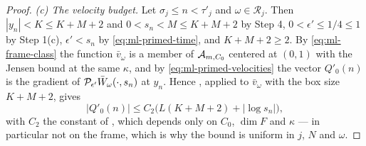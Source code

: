\begin{proof}
\emph{(c) The velocity budget.} Let $\sigma_j\le n<\tau'_j$ and
$\omega\in\mathcal R_j$. Then $|y_n|<K\le K+M+2$ and $0<s_n<M\le K+M+2$ by
Step 4, $0<\epsilon'\le1/4\le1$ by Step 1(c), $\epsilon'<s_n$ by
\eqref{eq:ml-primed-time}, and $K+M+2\ge2$. By \eqref{eq:ml-frame-class} the
function $\bar v_\omega$ is a member of $\mathcal{A}_{m,C_0}$ centered at $(0,1)$
with the Jensen bound at the same $\kappa$, and by
\eqref{eq:ml-primed-velocities} the vector $Q'_0(n)$ is the gradient of
$\mathcal{P}_{\epsilon'}\bar W_\omega(\cdot,s_n)$ at $y_n$. Hence
, applied to $\bar v_\omega$ with the box size
$K+M+2$, gives
\begin{equation}\label{eq:ml-Q0prime}
  |Q'_0(n)|\le C_2\bigl(L(K+M+2)+|\log s_n|\bigr),
\end{equation}
with $C_2$ the constant of , which depends only on
$C_0$, $\dim F$ and $\kappa$ --- in particular not on the frame, which is why
the bound is uniform in $j$, $N$ and $\omega$.


\end{proof}
